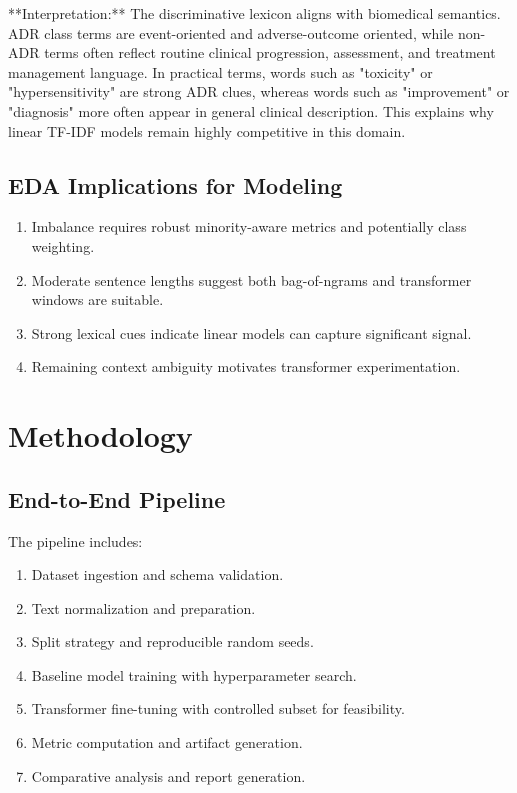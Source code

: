 \documentclass[11pt]{article}
\begin{document}
**Interpretation:** The discriminative lexicon aligns with biomedical semantics. ADR class terms are event-oriented and adverse-outcome oriented, while non-ADR terms often reflect routine clinical progression, assessment, and treatment management language. In practical terms, words such as "toxicity" or "hypersensitivity" are strong ADR clues, whereas words such as "improvement" or "diagnosis" more often appear in general clinical description. This explains why linear TF-IDF models remain highly competitive in this domain.


\subsection{EDA Implications for Modeling}

\begin{enumerate}
  \item Imbalance requires robust minority-aware metrics and potentially class weighting.
  \item Moderate sentence lengths suggest both bag-of-ngrams and transformer windows are suitable.
  \item Strong lexical cues indicate linear models can capture significant signal.
  \item Remaining context ambiguity motivates transformer experimentation.
\end{enumerate}

\section{Methodology}

\subsection{End-to-End Pipeline}

The pipeline includes:


\begin{enumerate}
  \item Dataset ingestion and schema validation.
  \item Text normalization and preparation.
  \item Split strategy and reproducible random seeds.
  \item Baseline model training with hyperparameter search.
  \item Transformer fine-tuning with controlled subset for feasibility.
  \item Metric computation and artifact generation.
  \item Comparative analysis and report generation.
\end{enumerate}
\end{document}
